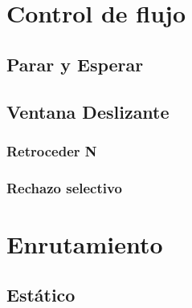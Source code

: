 \documentclass[12pt, fleqn]{report}                             %
\theoremstyle{break}                                            %
\begin{document}
    \chapter{Control de flujo}

            \section{Parar y Esperar}

            \section{Ventana Deslizante}

                    \subsection{Retroceder N}
                    \subsection{Rechazo selectivo}

    \chapter{Enrutamiento}

            \section{Estático}
\end{document}
